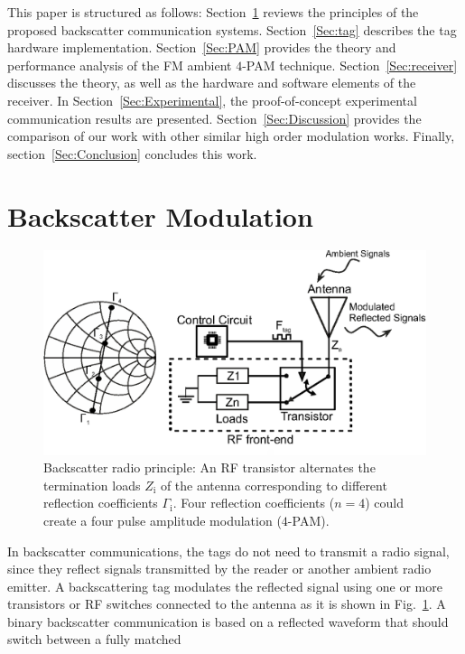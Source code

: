 \documentclass[journal]{IEEEtran}
\begin{document}
This paper is structured as follows: Section~\ref{Sec:back} reviews the  principles of the proposed backscatter communication systems. 
%
Section~\ref{Sec:tag} describes the tag hardware implementation. 
%
Section~\ref{Sec:PAM} provides the theory and performance
analysis of the FM ambient $4$-PAM  technique.
%
Section~\ref{Sec:receiver} discusses the theory, as well as the hardware and software elements of the receiver.
%
In Section~\ref{Sec:Experimental}, the proof-of-concept experimental communication  results are presented.
%
Section~\ref{Sec:Discussion} provides the comparison of our work with other similar high order modulation works.
%
Finally, section~\ref{Sec:Conclusion} concludes this work.



\section{Backscatter Modulation}
\label{Sec:back}
%
\begin{figure}[t]
\centering
\includegraphics[width=1\columnwidth]{Figures/Fig2.eps}
\caption{Backscatter radio principle: An RF transistor alternates the termination loads $Z_\text{i}$ of the antenna corresponding to different  reflection coefficients $\Gamma_\text{i}$. Four reflection coefficients ($n=4$) could create a four pulse amplitude modulation ($4$-PAM).}
\label{fig:backscatter}
\end{figure}
%
In backscatter communications, the tags do not need to transmit a radio signal, since they reflect signals transmitted by the reader or another ambient radio emitter.
%
A backscattering tag modulates the reflected signal using one or more transistors or RF switches connected to the antenna as it is shown in Fig.~\ref{fig:backscatter}.
%
A  binary backscatter communication is  based on a reflected waveform that should switch between a fully matched 
\end{document}
